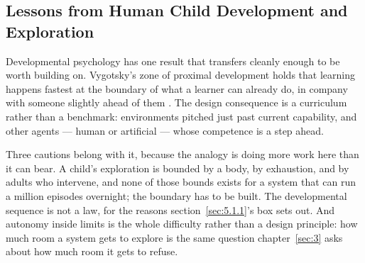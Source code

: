 \subsection{Lessons from Human Child Development and Exploration}
\label{sec:4.3.2}
Developmental psychology has one result that transfers cleanly enough to be worth building on. Vygotsky's zone of proximal development holds that learning happens fastest at the boundary of what a learner can already do, in company with someone slightly ahead of them \autocite{vygotsky1978mind}. The design consequence is a curriculum rather than a benchmark: environments pitched just past current capability, and other agents — human or artificial — whose competence is a step ahead.

Three cautions belong with it, because the analogy is doing more work here than it can bear. A child's exploration is bounded by a body, by exhaustion, and by adults who intervene, and none of those bounds exists for a system that can run a million episodes overnight; the boundary has to be built. The developmental sequence is not a law, for the reasons section~\ref{sec:5.1.1}'s box sets out. And autonomy inside limits is the whole difficulty rather than a design principle: how much room a system gets to explore is the same question chapter~\ref{sec:3} asks about how much room it gets to refuse.

